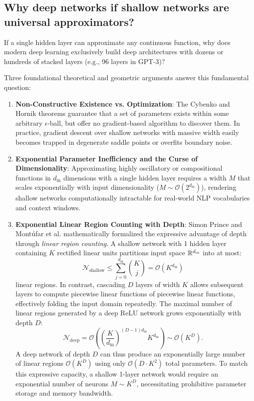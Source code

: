 \documentclass[../../main.tex]{subfiles}
\begin{document}
\subsection{Why deep networks if shallow networks are universal approximators?}
If a single hidden layer can approximate any continuous function, why does modern deep learning exclusively build deep architectures with dozens or hundreds of stacked layers (e.g., 96 layers in GPT-3)?

Three foundational theoretical and geometric arguments answer this fundamental question:
\begin{enumerate}
    \item \textbf{Non-Constructive Existence vs. Optimization}: The Cybenko and Hornik theorems guarantee that a set of parameters exists within some arbitrary $\epsilon$-ball, but offer no gradient-based algorithm to discover them. In practice, gradient descent over shallow networks with massive width easily becomes trapped in degenerate saddle points or overfits boundary noise.
    \item \textbf{Exponential Parameter Inefficiency and the Curse of Dimensionality}: Approximating highly oscillatory or compositional functions in $d_{\text{in}}$ dimensions with a single hidden layer requires a width $M$ that scales exponentially with input dimensionality ($M \sim \mathcal{O}(2^{d_{\text{in}}})$), rendering shallow networks computationally intractable for real-world NLP vocabularies and context windows.
    \item \textbf{Exponential Linear Region Counting with Depth}: Simon Prince \cite{prince2023udl} and Montúfar et al. \cite{montufar2014number} mathematically formalized the expressive advantage of depth through \emph{linear region counting}. A shallow network with 1 hidden layer containing $K$ rectified linear units partitions input space $\mathbb{R}^{d_{\text{in}}}$ into at most:
    \begin{equation}
    \label{eq:shallow_linear_regions}
    \mathcal{N}_{\text{shallow}} \le \sum_{j=0}^{d_{\text{in}}} \binom{K}{j} = \mathcal{O}(K^{d_{\text{in}}})
    \end{equation}
    linear regions. In contrast, cascading $D$ layers of width $K$ allows subsequent layers to compute piecewise linear functions of piecewise linear functions, effectively folding the input domain repeatedly. The maximal number of linear regions generated by a deep ReLU network grows exponentially with depth $D$:
    \begin{equation}
    \label{eq:deep_linear_regions}
    \mathcal{N}_{\text{deep}} = \mathcal{O}\left( \left(\frac{K}{d_{\text{in}}}\right)^{(D-1)d_{\text{in}}} K^{d_{\text{in}}} \right) \sim \mathcal{O}(K^D).
    \end{equation}
    A deep network of depth $D$ can thus produce an exponentially large number of linear regions $\mathcal{O}(K^D)$ using only $\mathcal{O}(D \cdot K^2)$ total parameters. To match this expressive capacity, a shallow 1-layer network would require an exponential number of neurons $M \sim K^D$, necessitating prohibitive parameter storage and memory bandwidth.
\end{enumerate}
\end{document}
